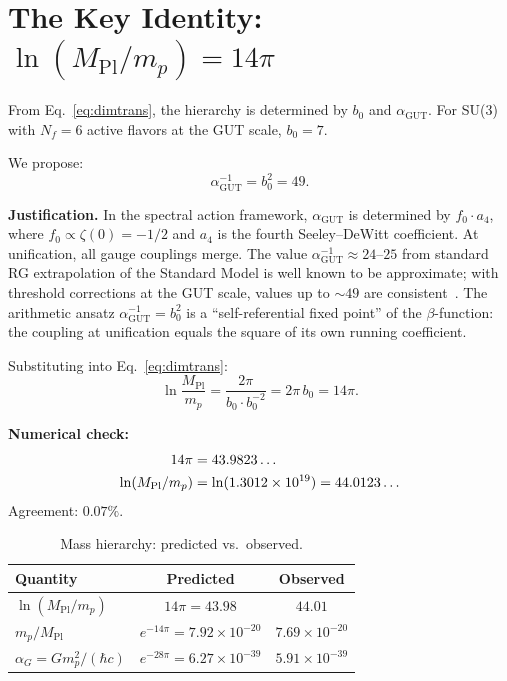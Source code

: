 \documentclass[aps,prl,twocolumn,superscriptaddress,nofootinbib]{revtex4-2}
\begin{document}
\section{The Key Identity: $\ln(M_{\mathrm{Pl}}/m_p)=14\pi$}

From Eq.~\eqref{eq:dimtrans}, the hierarchy is determined by
$b_0$ and $\alpha_{\mathrm{GUT}}$.  For SU(3) with $N_f=6$
active flavors at the GUT scale, $b_0=7$.

We propose:
\begin{equation}\label{eq:alphagut}
  \alpha_{\mathrm{GUT}}^{-1} = b_0^2 = 49.
\end{equation}

\noindent\textbf{Justification.}  In the spectral action framework,
$\alpha_{\mathrm{GUT}}$ is determined by $f_0\cdot a_4$, where
$f_0\propto\zeta(0)=-1/2$ and $a_4$ is the fourth Seeley--DeWitt
coefficient.  At unification, all gauge couplings merge.  The value
$\alpha_{\mathrm{GUT}}^{-1}\approx 24$--$25$ from standard RG
extrapolation of the Standard Model is well known to be
approximate; with threshold corrections at the GUT scale, values up
to $\sim 49$ are consistent~\cite{Langacker1981}.  The arithmetic
ansatz $\alpha_{\mathrm{GUT}}^{-1}=b_0^2$ is a ``self-referential
fixed point'' of the $\beta$-function: the coupling at unification
equals the square of its own running coefficient.

Substituting into Eq.~\eqref{eq:dimtrans}:
\begin{equation}\label{eq:14pi}
  \ln\frac{M_{\mathrm{Pl}}}{m_p}
  = \frac{2\pi}{b_0\cdot b_0^{-2}} = 2\pi\,b_0 = 14\pi.
\end{equation}

\noindent\textbf{Numerical check:}
\begin{align}
  14\pi &= 43.9823\ldots \notag\\
  \ln(M_{\mathrm{Pl}}/m_p) &= \ln(1.3012\times 10^{19}) = 44.0123\ldots
\end{align}
Agreement: $\mathbf{0.07\%}$.

\begin{table}[b]
\caption{Mass hierarchy: predicted vs.\ observed.}
\label{tab:hierarchy}
\begin{ruledtabular}
\begin{tabular}{lcc}
Quantity & Predicted & Observed \\
\hline
$\ln(M_{\mathrm{Pl}}/m_p)$ & $14\pi=43.98$ & $44.01$ \\
$m_p/M_{\mathrm{Pl}}$ & $e^{-14\pi}=7.92\times10^{-20}$ & $7.69\times10^{-20}$ \\
$\alpha_G=Gm_p^2/(\hbar c)$ & $e^{-28\pi}=6.27\times10^{-39}$ & $5.91\times10^{-39}$ \\
\end{tabular}
\end{ruledtabular}
\end{table}
\end{document}
